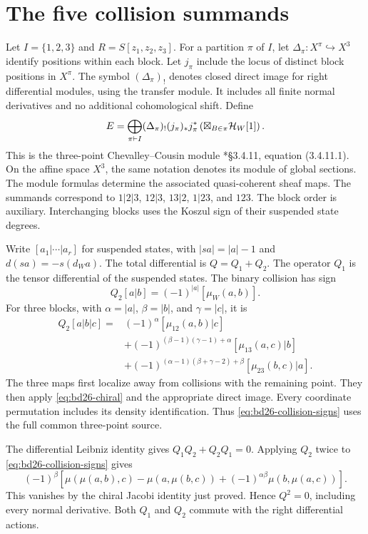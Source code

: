 \section{The five collision summands}

Let $I=\{1,2,3\}$ and $R=S[z_1,z_2,z_3]$.
For a partition $\pi$ of $I$, let $\Delta_\pi:X^\pi\hookrightarrow X^3$ identify positions within each block.
Let $j_\pi$ include the locus of distinct block positions in $X^\pi$.
The symbol $(\Delta_\pi)_!$ denotes closed direct image for right differential modules, using the transfer module.
It includes all finite normal derivatives and no additional cohomological shift.
Define
\begin{equation}\label{eq:bd26-target}
 E=
 \bigoplus_{\pi\vdash I}
 (\Delta_\pi)_!(j_\pi)_*j_\pi^*
 \left(\boxtimes_{B\in\pi}\mathcal H_W[1]\right).
\end{equation}
This is the three-point Chevalley--Cousin module
\cite{BDdiagonal}*{\S3.4.11, equation (3.4.11.1)}.
On the affine space $X^3$, the same notation denotes its module of global sections.
The module formulas determine the associated quasi-coherent sheaf maps.
The summands correspond to $1|2|3$, $12|3$, $13|2$, $1|23$, and $123$.
The block order is auxiliary.
Interchanging blocks uses the Koszul sign of their suspended state degrees.

Write $[a_1|\cdots|a_r]$ for suspended states, with
$|sa|=|a|-1$ and $d(sa)=-s(d_Wa)$.
The total differential is $Q=Q_1+Q_2$.
The operator $Q_1$ is the tensor differential of the suspended states.
The binary collision has sign
\[
 Q_2[a|b]=(-1)^{|a|}[\mu_W(a,b)].
\]
For three blocks, with $\alpha=|a|$, $\beta=|b|$, and $\gamma=|c|$, it is
\begin{equation}\label{eq:bd26-collision-signs}
 \begin{aligned}
 Q_2[a|b|c]={}&(-1)^\alpha[\mu_{12}(a,b)|c]\\
 &+(-1)^{(\beta-1)(\gamma-1)+\alpha}[\mu_{13}(a,c)|b]\\
 &+(-1)^{(\alpha-1)(\beta+\gamma-2)+\beta}[\mu_{23}(b,c)|a].
 \end{aligned}
\end{equation}
The three maps first localize away from collisions with the remaining point.
They then apply \eqref{eq:bd26-chiral} and the appropriate direct image.
Every coordinate permutation includes its density identification.
Thus \eqref{eq:bd26-collision-signs} uses the full common three-point source.

The differential Leibniz identity gives $Q_1Q_2+Q_2Q_1=0$.
Applying $Q_2$ twice to \eqref{eq:bd26-collision-signs} gives
\[
 (-1)^\beta[
 \mu(\mu(a,b),c)-\mu(a,\mu(b,c))
       +(-1)^{\alpha\beta}\mu(b,\mu(a,c))].
\]
This vanishes by the chiral Jacobi identity just proved.
Hence $Q^2=0$, including every normal derivative.
Both $Q_1$ and $Q_2$ commute with the right differential actions.

